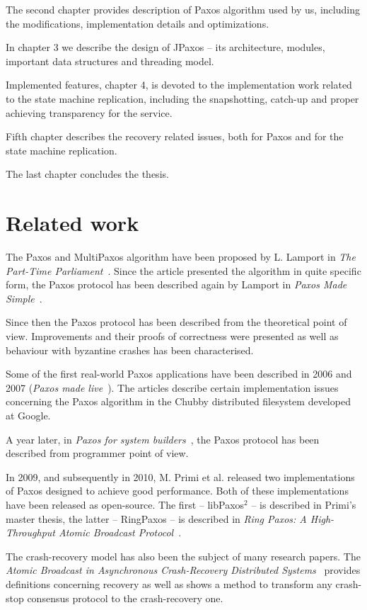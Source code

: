 The second chapter provides description of Paxos algorithm used by us, including the modifications, implementation details and optimizations.

In chapter 3 we describe the design of JPaxos -- its architecture, modules, important data structures and threading model.

Implemented features, chapter 4, is devoted to the implementation work related to the state machine replication, including the snapshotting, catch-up and proper achieving transparency for the service.

Fifth chapter describes the recovery related issues, both for Paxos and for the state machine replication.

The last chapter concludes the thesis.

\section{Related work}

The Paxos and MultiPaxos algorithm have been proposed by L. Lamport in \textit{The Part-Time Parliament}~\cite{Lam98}. Since the article presented the algorithm in quite specific form, the Paxos protocol has been described again by Lamport in \textit{Paxos Made Simple}~\cite{Lam01}.

Since then the Paxos protocol has been described from the theoretical point of view. Improvements and their proofs of correctness were presented as well as behaviour with byzantine crashes has been characterised.

Some of the first real-world Paxos applications have been described in 2006 and 2007 (\textit{Paxos made live}~\cite{CGR07}). The articles describe certain implementation issues concerning the Paxos algorithm in the Chubby distributed filesystem developed at Google.

A year later, in \textit{Paxos for system builders}~\cite{AK08}, the Paxos protocol has been described from programmer point of view.

In 2009, and subsequently in 2010, M. Primi et al. released two implementations of Paxos designed to achieve good performance. Both of these implementations have been released as open-source. The first -- libPaxos$^2$ -- is described in Primi's master thesis, the latter -- RingPaxos -- is described in \textit{Ring Paxos: A High-Throughput Atomic Broadcast Protocol}~\cite{Mar10}.

The crash-recovery model has also been the subject of many research papers. The \textit{Atomic Broadcast in Asynchronous Crash-Recovery Distributed Systems}~\cite{rodriguez2000atomic} provides definitions concerning recovery as well as shows a method to transform any crash-stop consensus protocol to the crash-recovery one.

